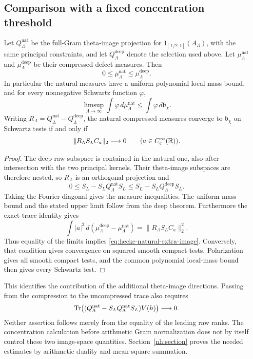 \subsection{Comparison with a fixed concentration threshold}
\begin{proposition}
\label{prop:hecke-natural-upper}
Let $Q_\Lambda^{\mathrm{nat}}$ be the full-Gram theta-image projection
for $1_{[1/2,1]}(A_\Lambda)$, with the same principal constraints,
and let $Q_\Lambda^{\mathrm{deep}}$ denote the selection used above.
Let $\mu_\Lambda^{\mathrm{nat}}$ and $\mu_\Lambda^{\mathrm{deep}}$
be their compressed defect measures. Then
\[
 0\leq\mu_\Lambda^{\mathrm{nat}}\leq
                     \mu_\Lambda^{\mathrm{deep}}.
\]
In particular the natural measures have a uniform polynomial local-mass
bound, and for every nonnegative Schwartz function $\varphi$,
\[
 \limsup_{\Lambda\to\infty}\int\varphi\,d\mu_\Lambda^{\mathrm{nat}}
                              \leq\int\varphi\,d\mathfrak b_\chi.
\]
Writing $R_\Lambda=Q_\Lambda^{\mathrm{nat}}-Q_\Lambda^{\mathrm{deep}}$,
the natural compressed measures converge to $\mathfrak b_\chi$ on
Schwartz tests if and only if
\begin{equation}\label{eq:hecke-natural-extra-image}
 \|R_\Lambda S_LC_a\|_2\longrightarrow0
                           \qquad(a\in C_c^\infty(\mathbb R)).
\end{equation}
\end{proposition}
\begin{proof}
The deep raw subspace is contained in the natural one, also after
intersection with the two principal kernels. Their theta-image
subspaces are therefore nested, so $R_\Lambda$ is an orthogonal
projection and
\[
 0\leq S_L-S_LQ_\Lambda^{\mathrm{nat}}S_L
       \leq S_L-S_LQ_\Lambda^{\mathrm{deep}}S_L.
\]
Taking the Fourier diagonal gives the measure inequalities. The
uniform mass bound and the stated upper limit follow from the deep
theorem. Furthermore the exact trace identity gives
\[
 \int |a|^2\,d(\mu_\Lambda^{\mathrm{deep}}-
                          \mu_\Lambda^{\mathrm{nat}})
                 =\|R_\Lambda S_LC_a\|_2^2.
\]
Thus equality of the limits implies \eqref{eq:hecke-natural-extra-image}.
Conversely, that condition gives convergence on squared smooth compact
tests. Polarization gives all smooth compact tests, and the common
polynomial local-mass bound then gives every Schwartz test.
\end{proof}

This identifies the contribution of the additional theta-image
directions. Passing from the compression to the uncompressed trace
also requires
\[
 \operatorname{Tr}\bigl((Q_\Lambda^{\mathrm{nat}}-
                 S_LQ_\Lambda^{\mathrm{nat}}S_L)V(h)\bigr)\longrightarrow0.
\]
Neither assertion follows merely from the equality of the leading raw
ranks. The concentration calculation before arithmetic Gram normalization
does not by itself control these two image-space quantities.
Section~\ref{nh:section} proves the needed estimates by arithmetic
duality and mean-square summation.

